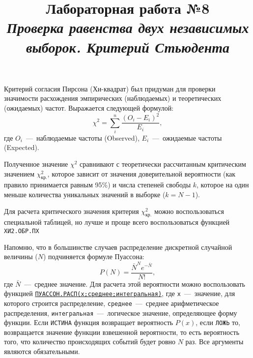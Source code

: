 \documentclass[14pt,a4paper]{article}
\title{Лабораторная работа №8 \\ \textit{Проверка равенства двух независимых выборок. Критерий Стьюдента}}
\begin{document}
\maketitle
Критерий согласия Пирсона (Хи-квадрат) был придуман для проверки значимости расхождения эмпирических (наблюдаемых) и теоретических (ожидаемых) частот. Выражается следующей формулой:
\begin{equation} \label{PoissonDistrib}
    \chi^2 = \sum\limits_i^n \frac{(O_i - E_i)^2}{E_i},
\end{equation}
где $O_i$~---~наблюдаемые частоты (Observed), $E_i$~---~ожидаемые частоты (Expected). 

Полученное значение $\chi^2$ сравнивают с теоретически рассчитанным критическим значением $\chi^2_\text{кр.}$, которое зависит от значения доверительной вероятности (как правило принимается равным 95\%) и числа степеней свободы $k$, которое на один меньше количества уникальных значений в выборке ($k = N - 1$). 

Для расчета критического значения критерия $\chi^2_\text{кр.}$ можно воспользоваться специальной таблицей, но лучше и проще всего воспользоваться функцией \texttt{ХИ2.ОБР.ПХ}

Напомню, что в большинстве случаев распределение дискретной случайной величины ($N$) подчиняется формуле Пуассона:
\begin{equation}
	P(N) = \frac{\bar{N}^N e^{-\bar{N}}}{N!},
\end{equation}
где $\bar{N}$~---~среднее значение. Для расчета этой вероятности можно воспользовать функцией \href{https://support.microsoft.com/ru-ru/office/%D1%84%D1%83%D0%BD%D0%BA%D1%86%D0%B8%D1%8F-%D0%BF%D1%83%D0%B0%D1%81%D1%81%D0%BE%D0%BD-%D1%80%D0%B0%D1%81%D0%BF-8fe148ff-39a2-46cb-abf3-7772695d9636}{\texttt{ПУАССОН.РАСП(x;среднее;интегральная)}}, 
где 
\verb=x=~---~значение, для которого строится распределение,
\verb=среднее=~---~среднее арифметическое распределения,
\verb=интегральная=~---~логическое значение, определяющее форму функции. Если \verb=ИСТИНА= функция возвращает вероятность $P(x)$, если \verb=ЛОЖЬ= то, возвращается значение функции взвешенной вероятности, то есть вероятность того, что количество происходящих событий будет ровно $N$ раз. Все аргументы являются обязательными.

\end{document}
